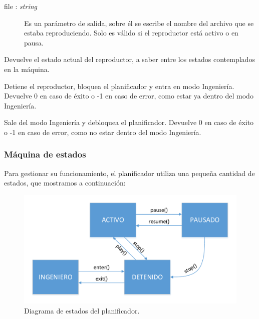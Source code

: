 \begin{description}[style=nextline]
	\begin{description}
		\item[file : \textit{string}] Es un parámetro de salida, sobre él se escribe el nombre del archivo que se estaba reproduciendo. Solo es válido si el reproductor está activo o en pausa.
	\end{description}
	
	Devuelve el estado actual del reproductor, a saber entre los estados contemplados en la máquina.
	
	\item[player\_engineer\_enter () : \textit{integer}]
	Detiene el reproductor, bloquea el planificador y entra en modo Ingeniería. Devuelve 0 en caso de éxito o -1 en caso de error, como estar ya dentro del modo Ingeniería.
	
	\item[player\_engineer\_exit () : \textit{integer}]
	Sale del modo Ingeniería y debloquea el planificador. Devuelve 0 en caso de éxito o -1 en caso de error, como no estar dentro del modo Ingeniería.
	
\end{description}

\subsubsection{Máquina de estados}

Para gestionar su funcionamiento, el planificador utiliza una pequeña cantidad de estados, que mostramos a continuación:

\smallskip

\begin{figure}[H]
	\noindent \begin{centering}
		\includegraphics[width=\linewidth*3/4]{capitulo4/sched}
		\par\end{centering}
	\smallskip
	\caption{\label{fig:sched} Diagrama de estados del planificador.}
\end{figure} 

